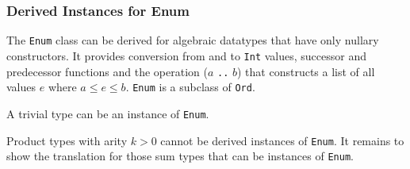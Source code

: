 \subsubsection{Derived Instances for Enum}

The \texttt{Enum} class can be derived for algebraic datatypes that have only nullary constructors.
It provides conversion from and to \texttt{Int} values, successor and predecessor functions and the operation ($a$ \texttt{..} $b$) that constructs a list of all values $e$ where $a \le e \le b$. \texttt{Enum} is a subclass of \texttt{Ord}.

A trivial type can be an instance of \texttt{Enum}.

Product types with arity $k>0$ cannot be derived instances of \texttt{Enum}. It remains to show the translation for those sum types that can be instances of \texttt{Enum}.

